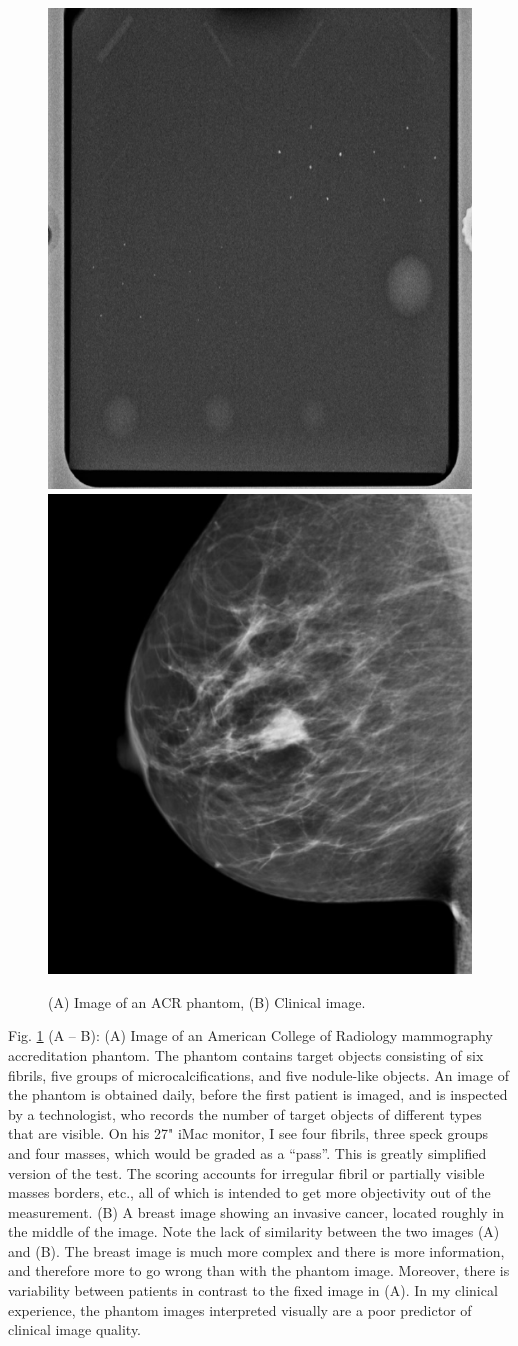\documentclass[
]{book}
\begin{document}
\begin{figure}
\includegraphics[width=0.5\linewidth]{images/AcrPhantom} \includegraphics[width=0.5\linewidth]{images/Clinical} \caption{(A) Image of an ACR phantom, (B) Clinical image.}\label{fig:acr-phantom-clinical}
\end{figure}

Fig. \ref{fig:acr-phantom-clinical} (A -- B): (A) Image of an American College of Radiology mammography accreditation phantom. The phantom contains target objects consisting of six fibrils, five groups of microcalcifications, and five nodule-like objects. An image of the phantom is obtained daily, before the first patient is imaged, and is inspected by a technologist, who records the number of target objects of different types that are visible. On his 27" iMac monitor, I see four fibrils, three speck groups and four masses, which would be graded as a ``pass''. This is greatly simplified version of the test. The scoring accounts for irregular fibril or partially visible masses borders, etc., all of which is intended to get more objectivity out of the measurement. (B) A breast image showing an invasive cancer, located roughly in the middle of the image. Note the lack of similarity between the two images (A) and (B). The breast image is much more complex and there is more information, and therefore more to go wrong than with the phantom image. Moreover, there is variability between patients in contrast to the fixed image in (A). In my clinical experience, the phantom images interpreted visually are a poor predictor of clinical image quality.
\end{document}
